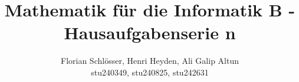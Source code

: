 \documentclass[12pt, a4paper]{article}
\title{Mathematik für die Informatik B - Hausaufgabenserie n}
\author{Florian Schlösser, Henri Heyden, Ali Galip Altun \\ \small stu240349, stu240825, stu242631}
\date{}
\begin{document}
\maketitle

\doublespacing
\end{document}
